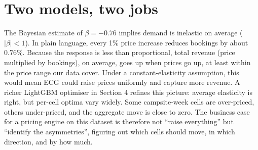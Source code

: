 \documentclass[11pt,a4paper]{article}
\begin{document}
\begin{center}
\end{center}

\section{Two models, two jobs}

The Bayesian estimate of $\beta = -0.76$ implies demand is inelastic on average ($|\beta| < 1$). In plain language, every 1\% price increase reduces bookings by about 0.76\%. Because the response is less than proportional, total revenue (price multiplied by bookings), on average, goes up when prices go up, at least within the price range our data cover. Under a constant-elasticity assumption, this would mean ECG could raise prices uniformly and capture more revenue. A richer LightGBM optimiser in Section 4 refines this picture: average elasticity is right, but per-cell optima vary widely. Some campsite-week cells are over-priced, others under-priced, and the aggregate move is close to zero. The business case for a pricing engine on this dataset is therefore not ``raise everything'' but ``identify the asymmetries'', figuring out which cells should move, in which direction, and by how much.
\end{document}
